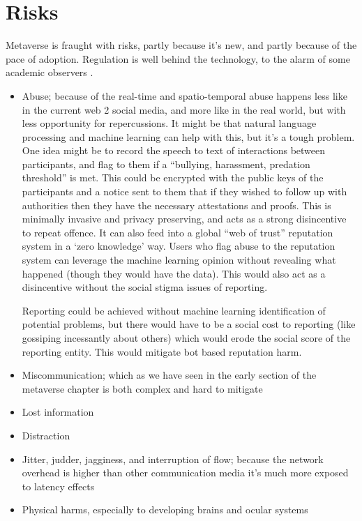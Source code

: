 \section{Risks}
Metaverse is fraught with risks, partly because it's new, and partly because of the pace of adoption. Regulation is well behind the technology, to the alarm of some academic observers \cite{rosenberg2022regulation}.
\begin{itemize}
\item Abuse; because of the real-time and spatio-temporal abuse happens less like in the current web 2 social media, and more like in the real world, but with less opportunity for repercussions. It might be that natural language processing and machine learning can help with this, but it's a tough problem. One idea might be to record the speech to text of interactions between participants, and flag to them if a ``bullying, harassment, predation threshold'' is met. This could be encrypted with the public keys of the participants and a notice sent to them that if they wished to follow up with authorities then they have the necessary attestations and proofs. This is minimally invasive and privacy preserving, and acts as a strong disincentive to repeat offence. It can also feed into a global ``web of trust'' reputation system in a `zero knowledge' way. Users who flag abuse to the reputation system can leverage the machine learning opinion without revealing what happened (though they would have the data). This would also act as a disincentive without the social stigma issues of reporting.\par
Reporting could be achieved without machine learning identification of potential problems, but there would have to be a social cost to reporting (like gossiping incessantly about others) which would erode the social score of the reporting entity. This would mitigate bot based reputation harm.
\item Miscommunication; which as we have seen in the early section of the metaverse chapter is both complex and hard to mitigate
\item Lost information
\item Distraction
\item Jitter, judder, jagginess, and interruption of flow; because the network overhead is higher than other communication media it's much more exposed to latency effects 
\item Physical harms, especially to developing brains and ocular systems
\end{itemize}
